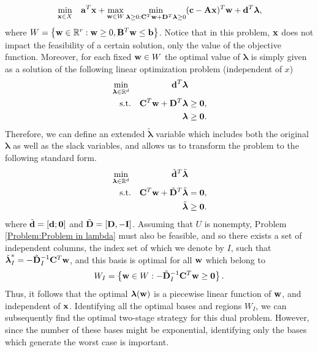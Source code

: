 \documentclass[12pt,x11names]{article}
\theoremstyle{definition}
\newcommand{\paren}[1]{\left\{ {#1} \right\}} %
\newcommand{\real}{\mathbb{R}} %
\newcommand{\bzero}{{\bf 0}}
\newcommand{\ba}{{\bf a}}
\newcommand{\bb}{{\bf b}}
\newcommand{\bc}{{\bf c}}
\newcommand{\bd}{{\bf d}}
\newcommand{\bw}{{\bf w}}
\newcommand{\bx}{{\bf x}}
\newcommand{\bba}{{\bf A}}
\newcommand{\bbb}{{\bf B}}
\newcommand{\bbc}{{\bf C}}
\newcommand{\bbd}{{\bf D}}
\newcommand{\bbi}{{\bf I}}
\newcommand{\blambda}{{\boldsymbol \lambda}}
\begin{document}
\begin{equation}\label{Problem:Two Stage Dual}
\begin{aligned}[t]
&\min_{\bx\in X} &\ba^T\bx+\max_{\bw\in W}\min_{\blambda\geq 0:\bbc^T\bw+\bbd^T\blambda\geq 0} (\bc-\bba\bx)^T\bw &+\bd^T\blambda,\\
\end{aligned}
\end{equation}
where $W=\paren{\bw\in\real^r: \bw\geq0,\bbb^T\bw\leq \bb}$.
Notice that in this problem, $\bx$ does not impact the feasibility of a certain solution, only the value of the objective function. Moreover, for each fixed $\bw\in W$ the optimal value of $\blambda$ is simply given as a solution of the following linear optimization problem (independent of $x$)
\begin{equation}\label{Problem:Lambda given w}
\begin{aligned}[t]
&\min_{\blambda\in \real^d} &\bd^T\blambda&\\
&\quad\text{s.t.}&\bbc^T\bw+\bbd^T\blambda&\geq \bzero,\\
&&\blambda&\geq \bzero.\\
\end{aligned}
\end{equation}
Therefore, we can define an extended $\tilde{\blambda}$ variable which includes both the original $\blambda$ as well as the slack variables, and allows us to transform the problem to the following standard form.
\begin{equation}\label{Problem:Problem in lambda}
\begin{aligned}[t]
&\min_{\blambda\in \real^d} &\tilde{\bd}^T\tilde{\blambda}&\\
&\quad\text{s.t.}&\bbc^T\bw+\tilde{\bbd}^T\tilde{\blambda}&= \bzero,\\
&&\tilde{\blambda}&\geq \bzero.\\
\end{aligned}
\end{equation}
where $\tilde{\bd}=[\bd;\bzero]$ and $\tilde{\bbd}=[\bbd, -\bbi]$. Assuming that $U$ is nonempty, Problem \eqref{Problem:Problem in lambda} must also be feasible, and so there exists a set of independent columns, the index set of which we denote by $I$, such that
$\tilde{\blambda}_I^*=-\tilde{\bbd}_I^{-1}\bbc^T\bw$, and this basis is optimal for all $\bw$ which belong to 
$$W_I=\paren{\bw\in W:-\tilde{\bbd}_I^{-1}\bbc^T\bw\geq \bzero}.$$ Thus, it follows that the optimal $\blambda(\bw)$ is a piecewise linear function of $\bw$, and independent of $\bx$. Identifying all the optimal bases and regions $W_I$, we can subsequently find the optimal two-stage strategy for this dual problem. However, since the number of these bases might be exponential, identifying only the bases which generate the worst case is important.
\end{document}
